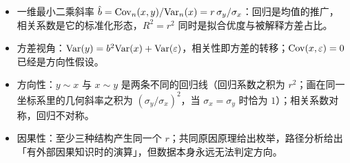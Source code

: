 \begin{keybox}[本章要点]
\begin{itemize}
  \item 一维最小二乘斜率 $\hat{b} = \mathrm{Cov}_n(x,y)/\mathrm{Var}_n(x) = r\,\sigma_y/\sigma_x$：回归是均值的推广，相关系数是它的标准化形态，$R^2 = r^2$ 同时是拟合优度与被解释方差占比。
  \item 方差视角：$\mathrm{Var}(y) = b^2\mathrm{Var}(x) + \mathrm{Var}(\varepsilon)$，相关性即方差的转移；$\mathrm{Cov}(x,\varepsilon)=0$ 已经是方向性假设。
  \item 方向性：$y \sim x$ 与 $x \sim y$ 是两条不同的回归线（回归系数之积为 $r^2$；画在同一坐标系里的几何斜率之积为 $(\sigma_y/\sigma_x)^2$，当 $\sigma_x = \sigma_y$ 时恰为 $1$）；相关系数对称，回归不对称。
  \item 因果性：至少三种结构产生同一个 $r$；共同原因原理给出枚举，路径分析给出「有外部因果知识时的演算」，但数据本身永远无法判定方向。
\end{itemize}
\end{keybox}
